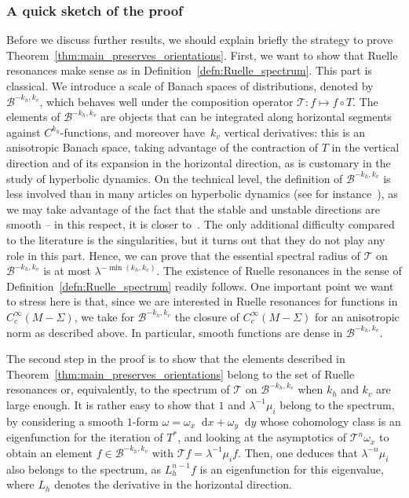 \documentclass[JEP,XML,SOM,Unicode]{cedram}
\newcommand{\boB}{\mathcal{B}}
\newcommand{\boT}{\mathcal{T}}
\newcommand{\dd}{\mathop{}\!\mathrm{d}}
\theoremstyle{definition}
\numberwithin{equation}{section}
\begin{document}
\subsubsection*{A quick sketch of the proof}
Before we discuss further results, we should explain briefly the strategy to
prove Theorem~\ref{thm:main_preserves_orientations}. First, we want to show
that Ruelle resonances make sense as in
Definition~\ref{defn:Ruelle_spectrum}. This part is classical. We introduce a
scale of Banach spaces of distributions, denoted by $\boB^{-k_h, k_v}$, which
behaves well under the composition operator $\boT : f \mapsto f \circ T$. The
elements of $\boB^{-k_h, k_v}$ are objects that can be integrated along
horizontal segments against $C^{k_h}$-functions, and moreover have~$k_v$
vertical derivatives: this is an anisotropic Banach space, taking advantage
of the contraction of $T$ in the vertical direction and of its expansion in
the horizontal direction, as is customary in the study of hyperbolic
dynamics. On the technical level, the definition of $\boB^{-k_h, k_v}$ is
less involved than in many articles on hyperbolic dynamics (see for
instance~\cite{GL_Anosov2, bt_aniso}), as we may take advantage of the fact
that the stable and unstable directions are smooth -- in this respect, it is
closer to~\cite{baladi_Cinfty, avila_gouezel}. The only additional difficulty
compared to the literature is the singularities, but it turns out that they
do not play any role in this part. Hence, we can prove that the essential
spectral radius of $\boT$ on $\boB^{-k_h, k_v}$ is at most
$\lambda^{-\min(k_h, k_v)}$. The existence of Ruelle resonances in the sense
of Definition~\ref{defn:Ruelle_spectrum} readily follows. One important point
we want to stress here is that, since we are interested in Ruelle resonances
for functions in $C^\infty_c(M-\Sigma)$, we take for $\boB^{-k_h, k_v}$ the
closure of $C^\infty_c(M-\Sigma)$ for an anisotropic norm as described above.
In particular, smooth functions are dense in $\boB^{-k_h, k_v}$.

The second step in the proof is to show that the elements described in
Theorem~\ref{thm:main_preserves_orientations} belong to the set of Ruelle
resonances or, equivalently, to the spectrum of $\boT$ on $\boB^{-k_h, k_v}$
when $k_h$ and $k_v$ are large enough. It is rather easy to show that $1$ and
$\lambda^{-1} \mu_i$ belong to the spectrum, by considering a smooth $1$-form
$\omega = \omega_x \dd x + \omega_y \dd y$ whose cohomology class is an
eigenfunction for the iteration of $T^*$, and looking at the asymptotics of
$\boT^n \omega_x$ to obtain an element $f\in \boB^{-k_h, k_v}$ with $\boT f =
\lambda^{-1} \mu_i f$. Then, one deduces that $\lambda^{-n} \mu_i$ also
belongs to the spectrum, as $L_h^{n-1} f$ is an eigenfunction for this
eigenvalue, where $L_h$ denotes the derivative in the horizontal direction.
\end{document}
